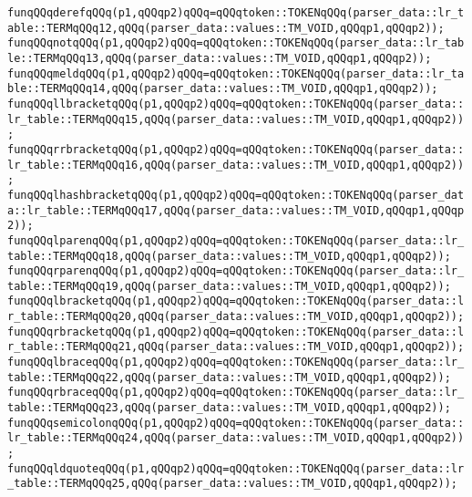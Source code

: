 \verb|funqQQqderefqQQq(p1,qQQqp2)qQQq=qQQqtoken::TOKENqQQq(parser_data::lr_table::TERMqQQq12,qQQq(parser_data::values::TM_VOID,qQQqp1,qQQqp2));|\newline
\verb|funqQQqnotqQQq(p1,qQQqp2)qQQq=qQQqtoken::TOKENqQQq(parser_data::lr_table::TERMqQQq13,qQQq(parser_data::values::TM_VOID,qQQqp1,qQQqp2));|\newline
\verb|funqQQqmeldqQQq(p1,qQQqp2)qQQq=qQQqtoken::TOKENqQQq(parser_data::lr_table::TERMqQQq14,qQQq(parser_data::values::TM_VOID,qQQqp1,qQQqp2));|\newline
\verb|funqQQqllbracketqQQq(p1,qQQqp2)qQQq=qQQqtoken::TOKENqQQq(parser_data::lr_table::TERMqQQq15,qQQq(parser_data::values::TM_VOID,qQQqp1,qQQqp2));|\newline
\verb|funqQQqrrbracketqQQq(p1,qQQqp2)qQQq=qQQqtoken::TOKENqQQq(parser_data::lr_table::TERMqQQq16,qQQq(parser_data::values::TM_VOID,qQQqp1,qQQqp2));|\newline
\verb|funqQQqlhashbracketqQQq(p1,qQQqp2)qQQq=qQQqtoken::TOKENqQQq(parser_data::lr_table::TERMqQQq17,qQQq(parser_data::values::TM_VOID,qQQqp1,qQQqp2));|\newline
\verb|funqQQqlparenqQQq(p1,qQQqp2)qQQq=qQQqtoken::TOKENqQQq(parser_data::lr_table::TERMqQQq18,qQQq(parser_data::values::TM_VOID,qQQqp1,qQQqp2));|\newline
\verb|funqQQqrparenqQQq(p1,qQQqp2)qQQq=qQQqtoken::TOKENqQQq(parser_data::lr_table::TERMqQQq19,qQQq(parser_data::values::TM_VOID,qQQqp1,qQQqp2));|\newline
\verb|funqQQqlbracketqQQq(p1,qQQqp2)qQQq=qQQqtoken::TOKENqQQq(parser_data::lr_table::TERMqQQq20,qQQq(parser_data::values::TM_VOID,qQQqp1,qQQqp2));|\newline
\verb|funqQQqrbracketqQQq(p1,qQQqp2)qQQq=qQQqtoken::TOKENqQQq(parser_data::lr_table::TERMqQQq21,qQQq(parser_data::values::TM_VOID,qQQqp1,qQQqp2));|\newline
\verb|funqQQqlbraceqQQq(p1,qQQqp2)qQQq=qQQqtoken::TOKENqQQq(parser_data::lr_table::TERMqQQq22,qQQq(parser_data::values::TM_VOID,qQQqp1,qQQqp2));|\newline
\verb|funqQQqrbraceqQQq(p1,qQQqp2)qQQq=qQQqtoken::TOKENqQQq(parser_data::lr_table::TERMqQQq23,qQQq(parser_data::values::TM_VOID,qQQqp1,qQQqp2));|\newline
\verb|funqQQqsemicolonqQQq(p1,qQQqp2)qQQq=qQQqtoken::TOKENqQQq(parser_data::lr_table::TERMqQQq24,qQQq(parser_data::values::TM_VOID,qQQqp1,qQQqp2));|\newline
\verb|funqQQqldquoteqQQq(p1,qQQqp2)qQQq=qQQqtoken::TOKENqQQq(parser_data::lr_table::TERMqQQq25,qQQq(parser_data::values::TM_VOID,qQQqp1,qQQqp2));|\newline
